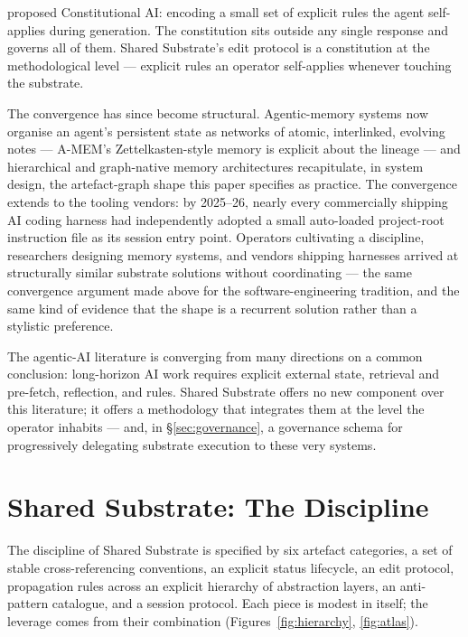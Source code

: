 \documentclass[11pt,a4paper,twocolumn]{article}
\begin{document}
\citet{bai2022constitutional} proposed Constitutional AI: encoding a
small set of explicit rules the agent self-applies during
generation. The constitution sits outside any single response and
governs all of them. Shared Substrate's edit protocol is a
constitution at the methodological level --- explicit rules an
operator self-applies whenever touching the substrate.

The convergence has since become structural. Agentic-memory
systems now organise an agent's persistent state as networks of
atomic, interlinked, evolving notes --- A-MEM's Zettelkasten-style
memory is explicit about the lineage \citep{xu2025amem} --- and
hierarchical and graph-native memory architectures recapitulate,
in system design, the artefact-graph shape this paper specifies as
practice. The convergence extends to the tooling vendors: by
2025--26, nearly every commercially shipping AI coding harness had
independently adopted a small auto-loaded project-root instruction
file as its session entry point. Operators cultivating a
discipline, researchers designing memory systems, and vendors
shipping harnesses arrived at structurally similar substrate
solutions without coordinating --- the same convergence argument
made above for the software-engineering tradition, and the same
kind of evidence that the shape is a recurrent solution rather
than a stylistic preference.

The agentic-AI literature is converging from many directions on a
common conclusion: long-horizon AI work requires explicit external
state, retrieval and pre-fetch, reflection, and rules. Shared
Substrate offers no new component over this literature; it offers
a methodology that integrates them at the level the operator
inhabits --- and, in \S\ref{sec:governance}, a governance schema
for progressively delegating substrate execution to these very
systems.

\section{Shared Substrate: The Discipline}
\label{sec:discipline}

The discipline of Shared Substrate is specified by six
artefact categories, a set of stable cross-referencing conventions,
an explicit status lifecycle, an edit protocol, propagation rules
across an explicit hierarchy of abstraction layers, an anti-pattern
catalogue, and a session protocol. Each piece is modest in itself;
the leverage comes from their combination
(Figures~\ref{fig:hierarchy}, \ref{fig:atlas}).
\end{document}
